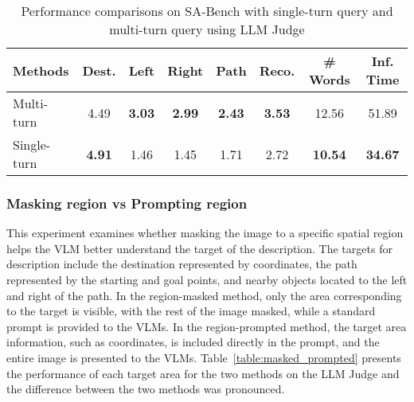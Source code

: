 \begin{table}[!ht]
    \vspace{-10pt}
    \caption{Performance comparisons on SA-Bench with single-turn query and multi-turn query using LLM Judge}
    \vspace{-7pt}
    \centering
    \begin{tabular}{|l|c|c|c|c|c||c|c|}
    \hline
        \textbf{Methods}         & \textbf{Dest.}  & \textbf{Left} & \textbf{Right} & \textbf{Path} & \textbf{Reco.} & \textbf{\# Words} & \textbf{Inf. Time} \\ \hline\hline
        Multi-turn     & 4.49 & \textbf{3.03} & \textbf{2.99} & \textbf{2.43} & \textbf{3.53} & 12.56 & 51.89 \\ \hline
        Single-turn    & \textbf{4.91} & 1.46 & 1.45 & 1.71 & 2.72 & \textbf{10.54} & \textbf{34.67} \\ \hline
    \end{tabular}
    \label{table:one_turn}
    \vspace{-8pt}
\end{table}

\subsubsection{Masking region vs Prompting region} 
This experiment examines whether masking the image to a specific spatial region helps the VLM better understand the target of the description. 
The targets for description include the destination represented by coordinates, the path represented by the starting and goal points, and nearby objects located to the left and right of the path.
In the region-masked method, only the area corresponding to the target is visible, with the rest of the image masked, while a standard prompt is provided to the VLMs.
In the region-prompted method, the target area information, such as coordinates, is included directly in the prompt, and the entire image is presented to the VLMs.
Table~\ref{table:masked_prompted} presents the performance of each target area for the two methods on the LLM Judge and the difference between the two methods was pronounced.

